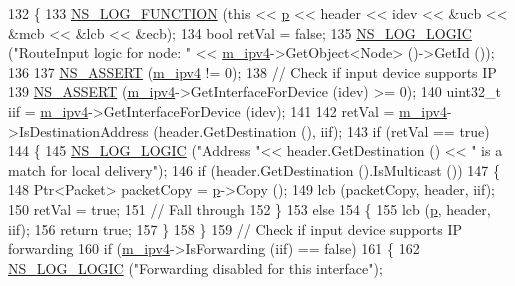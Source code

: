 \begin{DoxyCode}
132 \{
133   \hyperlink{log-macros-disabled_8h_a90b90d5bad1f39cb1b64923ea94c0761}{NS\_LOG\_FUNCTION} (\textcolor{keyword}{this} << \hyperlink{lte__link__budget_8m_ac9de518908a968428863f829398a4e62}{p} << header << idev << &ucb << &mcb << &lcb << &ecb);
134   \textcolor{keywordtype}{bool} retVal = \textcolor{keyword}{false};
135   \hyperlink{group__logging_ga88acd260151caf2db9c0fc84997f45ce}{NS\_LOG\_LOGIC} (\textcolor{stringliteral}{"RouteInput logic for node: "} << \hyperlink{classns3_1_1Ipv4ListRouting_aaf41416278c236de8b12028f91a40106}{m\_ipv4}->GetObject<Node> ()->GetId ());
136 
137   \hyperlink{assert_8h_a6dccdb0de9b252f60088ce281c49d052}{NS\_ASSERT} (\hyperlink{classns3_1_1Ipv4ListRouting_aaf41416278c236de8b12028f91a40106}{m\_ipv4} != 0);
138   \textcolor{comment}{// Check if input device supports IP }
139   \hyperlink{assert_8h_a6dccdb0de9b252f60088ce281c49d052}{NS\_ASSERT} (\hyperlink{classns3_1_1Ipv4ListRouting_aaf41416278c236de8b12028f91a40106}{m\_ipv4}->GetInterfaceForDevice (idev) >= 0);
140   uint32\_t iif = \hyperlink{classns3_1_1Ipv4ListRouting_aaf41416278c236de8b12028f91a40106}{m\_ipv4}->GetInterfaceForDevice (idev); 
141 
142   retVal = \hyperlink{classns3_1_1Ipv4ListRouting_aaf41416278c236de8b12028f91a40106}{m\_ipv4}->IsDestinationAddress (header.GetDestination (), iif);
143   \textcolor{keywordflow}{if} (retVal == \textcolor{keyword}{true})
144     \{
145       \hyperlink{group__logging_ga88acd260151caf2db9c0fc84997f45ce}{NS\_LOG\_LOGIC} (\textcolor{stringliteral}{"Address "}<< header.GetDestination () << \textcolor{stringliteral}{" is a match for local delivery"});
146       \textcolor{keywordflow}{if} (header.GetDestination ().IsMulticast ())
147         \{
148           Ptr<Packet> packetCopy = \hyperlink{lte__link__budget_8m_ac9de518908a968428863f829398a4e62}{p}->Copy ();
149           lcb (packetCopy, header, iif);
150           retVal = \textcolor{keyword}{true};
151           \textcolor{comment}{// Fall through}
152         \}
153       \textcolor{keywordflow}{else}
154         \{
155           lcb (\hyperlink{lte__link__budget_8m_ac9de518908a968428863f829398a4e62}{p}, header, iif);
156           \textcolor{keywordflow}{return} \textcolor{keyword}{true};
157         \}
158     \}
159   \textcolor{comment}{// Check if input device supports IP forwarding}
160   \textcolor{keywordflow}{if} (\hyperlink{classns3_1_1Ipv4ListRouting_aaf41416278c236de8b12028f91a40106}{m\_ipv4}->IsForwarding (iif) == \textcolor{keyword}{false})
161     \{
162       \hyperlink{group__logging_ga88acd260151caf2db9c0fc84997f45ce}{NS\_LOG\_LOGIC} (\textcolor{stringliteral}{"Forwarding disabled for this interface"});

\end{DoxyCode}
